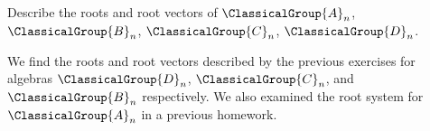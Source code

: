 
\begin{exercise}
Describe the roots and root vectors of $\ClassicalGroup{A}_{n}$, $\ClassicalGroup{B}_{n}$, $\ClassicalGroup{C}_{n}$, $\ClassicalGroup{D}_{n}$.
\end{exercise}
\answer We find the roots and root vectors described by the previous exercises
for algebras $\ClassicalGroup{D}_{n}$, $\ClassicalGroup{C}_{n}$, and $\ClassicalGroup{B}_{n}$
respectively. We also examined the root system for $\ClassicalGroup{A}_{n}$ in a
previous homework.


